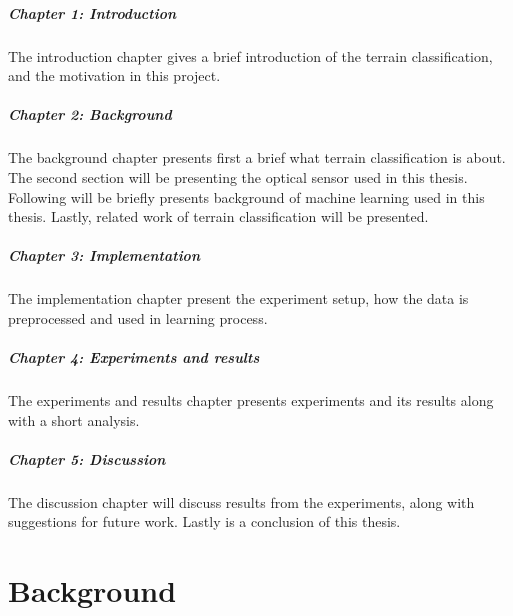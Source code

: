 \documentclass[USenglish]{ifimaster}  %
\begin{document}
	\paragraph{Chapter 1: Introduction}
	The introduction chapter gives a brief introduction of the terrain classification, and the motivation in this project.
	
	\paragraph{Chapter 2: Background}
	The background chapter presents first a brief what terrain classification is about. The second section will be presenting the optical sensor used in this thesis. Following will be briefly presents background of machine learning used in this thesis. Lastly, related work of terrain classification will be presented.
	
	\paragraph{Chapter 3: Implementation}
	The implementation chapter present the experiment setup, how the data is preprocessed and used in learning process.
	
	\paragraph{Chapter 4: Experiments and results}
	The experiments and results chapter presents experiments and its results along with a short analysis.
	
	\paragraph{Chapter 5: Discussion}
	The discussion chapter will discuss results from the experiments, along with suggestions for future work. Lastly is a conclusion of this thesis. 
	
	
	\chapter{Background}                  %
\end{document}
